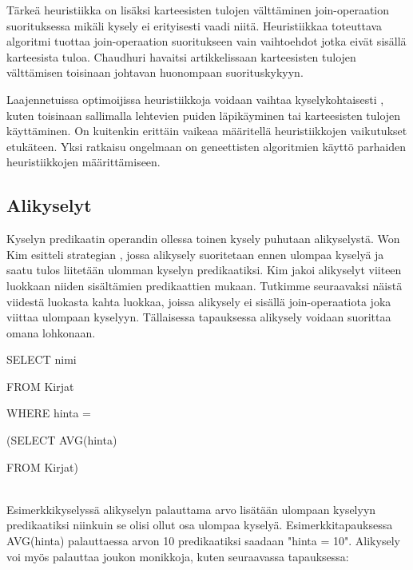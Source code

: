 \documentclass[finnish]{tktltiki2}
\theoremstyle{definition}
\theoremstyle{remark}
\begin{document}
Tärkeä heuristiikka on lisäksi karteesisten tulojen välttäminen join-operaation suorituksessa mikäli kysely ei erityisesti vaadi niitä. Heuristiikkaa toteuttava algoritmi tuottaa join-operaation suoritukseen vain vaihtoehdot jotka eivät sisällä karteesista tuloa. Chaudhuri havaitsi artikkelissaan \cite{chaudhuri1998} karteesisten tulojen välttämisen toisinaan johtavan huonompaan suorituskykyyn. 

Laajennetuissa optimoijissa heuristiikkoja voidaan vaihtaa kyselykohtaisesti \cite{chaudhuri1998}, kuten toisinaan sallimalla lehtevien puiden läpikäyminen tai karteesisten tulojen käyttäminen. On kuitenkin erittäin vaikeaa määritellä heuristiikkojen vaikutukset etukäteen. Yksi ratkaisu ongelmaan on geneettisten algoritmien \cite{bennett1991genetic} käyttö parhaiden heuristiikkojen määrittämiseen.
\subsection{Alikyselyt}
Kyselyn predikaatin operandin ollessa toinen kysely puhutaan alikyselystä. Won Kim esitteli strategian \cite{kim1982optimizing}, jossa alikysely suoritetaan ennen ulompaa kyselyä ja saatu tulos liitetään ulomman kyselyn predikaatiksi. Kim jakoi alikyselyt viiteen luokkaan niiden sisältämien predikaattien mukaan. Tutkimme seuraavaksi näistä viidestä luokasta kahta luokkaa, joissa alikysely ei sisällä join-operaatiota joka viittaa ulompaan kyselyyn. Tällaisessa tapauksessa alikysely voidaan suorittaa omana lohkonaan. 
\newline

\begin{frame}

SELECT nimi

FROM Kirjat

WHERE hinta = 

\hspace*{5mm}(SELECT AVG(hinta)
		
\hspace*{5mm}FROM Kirjat)
\end{frame}
\\\newline
Esimerkkikyselyssä alikyselyn palauttama arvo lisätään ulompaan kyselyyn predikaatiksi niinkuin se olisi ollut osa ulompaa kyselyä. Esimerkkitapauksessa AVG(hinta) palauttaessa arvon 10 predikaatiksi saadaan "hinta = 10". Alikysely voi myös palauttaa joukon monikkoja, kuten seuraavassa tapauksessa:
\newline
\end{document}

